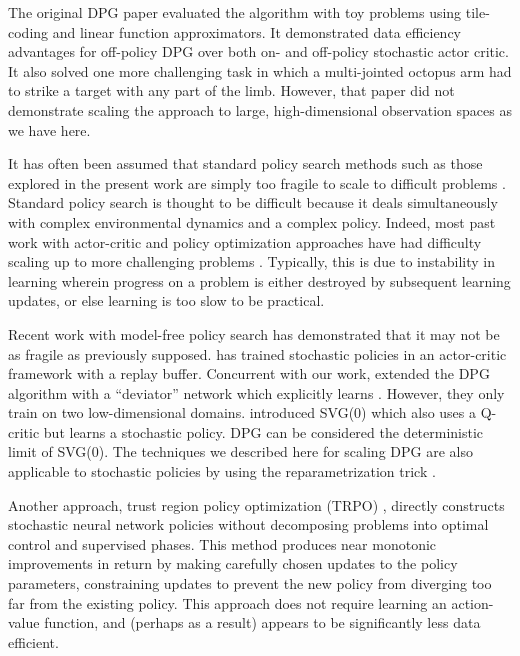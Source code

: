 \documentclass{article} \usepackage{iclr2016_conference,times}
\begin{document}
The original DPG paper evaluated the algorithm with toy problems using
tile-coding and linear function approximators.  It demonstrated data
efficiency advantages for off-policy DPG over both on- and off-policy
stochastic actor critic.  It also solved one more challenging task in
which a multi-jointed octopus arm had to strike a target with any part
of the limb. However, that paper did not demonstrate scaling the
approach to large, high-dimensional observation spaces as we have
here.

It has often been assumed that standard policy search methods such as
those explored in the present work are simply too fragile to scale to
difficult problems \citep{levine2015end}.  Standard policy search is
thought to be difficult because it deals simultaneously with complex
environmental dynamics and a complex policy.
Indeed,
most past work with actor-critic and policy optimization
approaches have had difficulty scaling up to more
challenging problems \citep{deisenroth2013survey}.
Typically, this is due to instability in
learning wherein progress on a problem is either destroyed by subsequent
learning updates, or else learning is too slow to be practical.

Recent work with model-free policy search has
demonstrated that it may not be as fragile as previously supposed.
\citet{wawrzynski2009real, wawrzynski2013autonomous} has
trained stochastic policies in an actor-critic framework
with a replay buffer.
Concurrent with our work, \citet{balduzzi2015compatible} extended the DPG
algorithm with a ``deviator'' network which explicitly learns
. However, they only train on two low-dimensional domains.
\citet{heess2015learning} introduced SVG(0) which also uses
a Q-critic but learns a stochastic policy.
DPG can be considered the deterministic limit of SVG(0). The techniques we
described here for scaling DPG are also applicable to stochastic policies by
using the reparametrization trick \citep{heessRDPG2015,schulman2015gradient}.

Another approach, trust region policy
optimization (TRPO) \citep{schulman2015trust}, directly constructs
stochastic neural network policies without decomposing problems into
optimal control and supervised phases.  This method produces near
monotonic improvements in return by making carefully chosen updates to
the policy parameters, constraining updates to prevent the new policy
from diverging too far from the existing policy.  This approach does
not require learning an action-value function, and (perhaps as a
result) appears to be significantly less data efficient.
\end{document}
